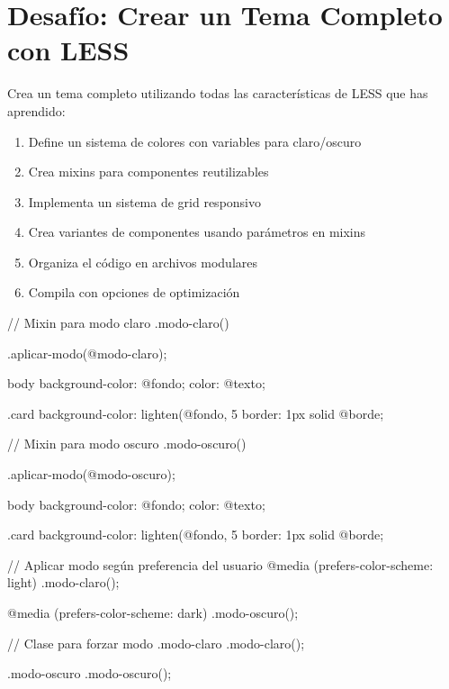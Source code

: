 \documentclass[12pt, a4paper]{article}
\begin{document}
\section*{Desafío: Crear un Tema Completo con LESS}

Crea un tema completo utilizando todas las características de LESS que has aprendido:

\begin{enumerate}
  \item Define un sistema de colores con variables para claro/oscuro
  \item Crea mixins para componentes reutilizables
  \item Implementa un sistema de grid responsivo
  \item Crea variantes de componentes usando parámetros en mixins
  \item Organiza el código en archivos modulares
  \item Compila con opciones de optimización
\end{enumerate}


\begin{codebox}[title=Ejemplo de tema con modo claro/oscuro continuación]
// Mixin para modo claro
.modo-claro() {
  .aplicar-modo(@modo-claro);
  
  body {
    background-color: @fondo;
    color: @texto;
  }
  
  .card {
    background-color: lighten(@fondo, 5%
    border: 1px solid @borde;
  }
}

// Mixin para modo oscuro
.modo-oscuro() {
  .aplicar-modo(@modo-oscuro);
  
  body {
    background-color: @fondo;
    color: @texto;
  }
  
  .card {
    background-color: lighten(@fondo, 5%
    border: 1px solid @borde;
  }
}

// Aplicar modo según preferencia del usuario
@media (prefers-color-scheme: light) {
  .modo-claro();
}

@media (prefers-color-scheme: dark) {
  .modo-oscuro();
}

// Clase para forzar modo
.modo-claro {
  .modo-claro();
}

.modo-oscuro {
  .modo-oscuro();
}
\end{codebox}
\end{document}

